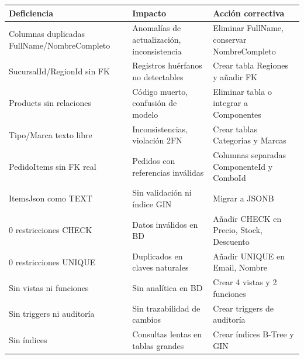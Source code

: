 \begin{center}
\begin{tablaAPA}
\begin{tabular}{L{4.0cm} L{4.5cm} L{4.5cm}}
\toprule
\textbf{Deficiencia} & \textbf{Impacto} & \textbf{Acción correctiva} \\
\midrule
Columnas duplicadas FullName/NombreCompleto & Anomalías de actualización, inconsistencia & Eliminar FullName, conservar NombreCompleto \\
SucursalId/RegionId sin FK & Registros huérfanos no detectables & Crear tabla Regiones y añadir FK \\
Products sin relaciones & Código muerto, confusión de modelo & Eliminar tabla o integrar a Componentes \\
Tipo/Marca texto libre & Inconsistencias, violación 2FN & Crear tablas Categorias y Marcas \\
PedidoItems sin FK real & Pedidos con referencias inválidas & Columnas separadas ComponenteId y ComboId \\
ItemsJson como TEXT & Sin validación ni índice GIN & Migrar a JSONB \\
0 restricciones CHECK & Datos inválidos en BD & Añadir CHECK en Precio, Stock, Descuento \\
0 restricciones UNIQUE & Duplicados en claves naturales & Añadir UNIQUE en Email, Nombre \\
Sin vistas ni funciones & Sin analítica en BD & Crear 4 vistas y 2 funciones \\
Sin triggers ni auditoría & Sin trazabilidad de cambios & Crear triggers de auditoría \\
Sin índices & Consultas lentas en tablas grandes & Crear índices B-Tree y GIN \\
\bottomrule
\end{tabular}
\end{tablaAPA}
\label{tab:deficiencias}
\end{center}
